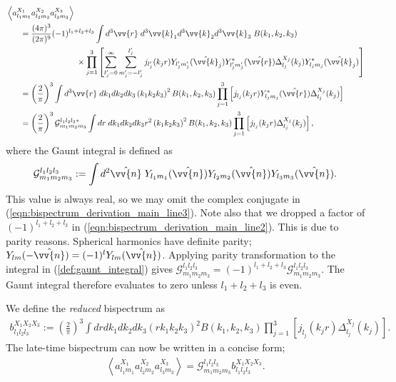 \documentclass[a4paper,12pt,times,custombib,print,index]{Classes/PhDThesisPSnPDF} %
\begin{document}
\begin{align}
	&\left< a_{l_1 m_1}^{X_1} a_{l_2 m_2}^{X_2} a_{l_3 m_3}^{X_3}  \right> \nonumber \\
	&\hspace{0.05\textwidth}= \frac{(4\pi)^3}{(2\pi)^9} (-1)^{l_1 + l_2 + l_3} \int d^3 \vv{r} \; d^3 \vv{k}_1 d^3 \vv{k}_2 d^3 \vv{k}_3 \; B(k_1,k_2,k_3) \nonumber \\
	&\hspace{0.25\textwidth} \times \prod_{j=1}^{3} \left[ \sum_{l'_j = 0}^{\infty} \sum_{m'_j=-l'_j}^{l'_j} j_{l'_j} (k_j r) Y_{l'_j m'_j} (\hat{\vv{k}}_j) Y^*_{l'_j m'_j} (\hat{\vv{r}}) \Delta_{l_j}^{X_j} (k_j) Y^*_{l_j m_j} (\hat{\vv{k}}_j) \right]  \label{eqn:bispectrum_derivation_main_line1}\\
	&\hspace{0.05\textwidth}= \left( \frac{2}{\pi} \right)^3 \int d^3 \vv{r} \; dk_1 dk_2 dk_3 \left( k_1 k_2 k_3 \right)^2 B(k_1, k_2, k_3) \prod_{j=1}^{3} \left[ j_{l_j} (k_j r) Y^*_{l_j m_j} (\hat{\vv{r}}) \Delta_{l_j}^{X_j} (k_j) \right]  \label{eqn:bispectrum_derivation_main_line2}\\
	&\hspace{0.05\textwidth}= \left( \frac{2}{\pi} \right)^3 \mathcal{G}^{l_1 l_2 l_3 *}_{m_1 m_2 m_3} \int dr \; dk_1 dk_2 dk_3 r^2 \left( k_1 k_2 k_3 \right)^2 B(k_1, k_2, k_3) \prod_{j=1}^{3} \left[ j_{l_j} (k_j r) \Delta_{l_j}^{X_j} (k_j) \right], \label{eqn:bispectrum_derivation_main_line3}
\end{align}
where the Gaunt integral is defined as
\begin{align}
	\mathcal{G}^{l_1 l_2 l_3}_{m_1 m_2 m_3} := \int d^2 \hat{\vv{n}} \; Y_{l_1 m_1} (\hat{\vv{n}}) Y_{l_2 m_2} (\hat{\vv{n}}) Y_{l_3 m_3} (\hat{\vv{n}}). \label{def:gaunt_integral}
\end{align}
This value is always real, so we may omit the complex conjugate in (\ref{eqn:bispectrum_derivation_main_line3}). Note also that we dropped a factor of $(-1)^{l_1+l_2+l_3}$ in (\ref{eqn:bispectrum_derivation_main_line2}). This is due to parity reasons. Spherical harmonics have definite parity; $Y_{lm}(-\hat{\vv{n}}) = (-1)^l Y_{lm}(\hat{\vv{n}})$. Applying parity transformation to the integral in (\ref{def:gaunt_integral}) gives $\mathcal{G}^{l_1 l_2 l_3}_{m_1 m_2 m_3} = (-1)^{l_1+l_2+l_3} \mathcal{G}^{l_1 l_2 l_3}_{m_1 m_2 m_3}$. The Gaunt integral therefore evaluates to zero unless $l_1+l_2+l_3$ is even.

We define the \textit{reduced} bispectrum as
\begin{align}
	b^{X_1 X_2 X_3}_{l_1 l_2 l_3} := \left( \frac{2}{\pi} \right)^3 \int dr dk_1 dk_2 dk_3 \left(r k_1 k_2 k_3 \right)^2 B(k_1, k_2, k_3) \prod_{j=1}^{3} \left[ j_{l_j} (k_j r) \Delta_{l_j}^{X_j} (k_j) \right]. \label{def:reduced_bispectrum}
\end{align}
The late-time bispectrum can now be written in a concise form;
\begin{align}
	\left< a_{l_1 m_1}^{X_1} a_{l_2 m_2}^{X_2} a_{l_3 m_3}^{X_3}  \right> = \mathcal{G}^{l_1 l_2 l_3}_{m_1 m_2 m_3} b^{X_1 X_2 X_3}_{l_1 l_2 l_3}. \label{eqn:late_time_bispectrum_form}
\end{align}
\end{document}
